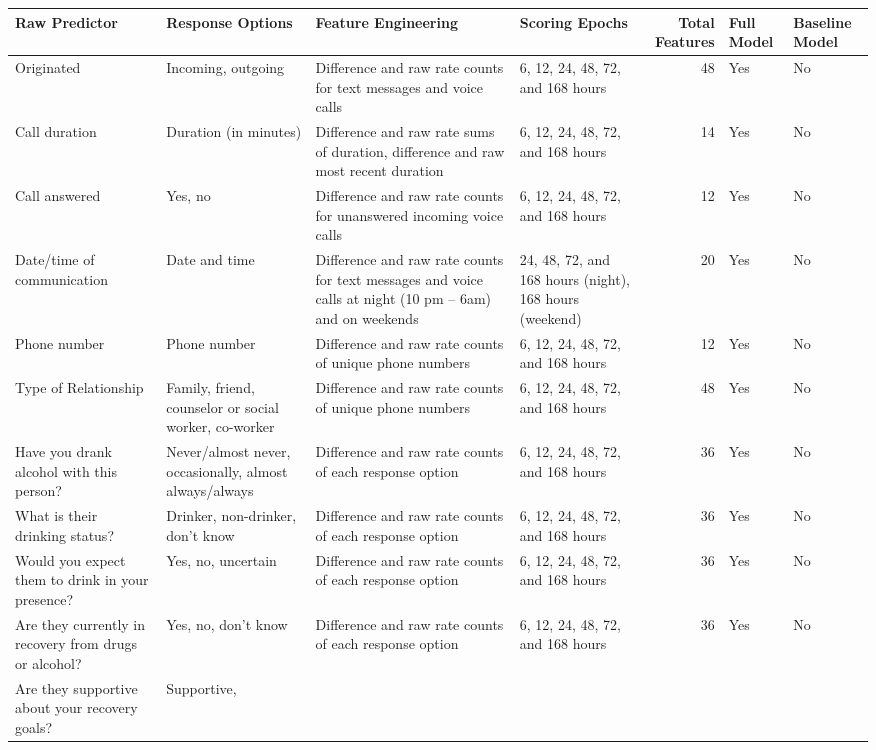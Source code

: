 \documentclass[
  letterpaper,
  DIV=11,
  numbers=noendperiod]{scrartcl}
\begin{document}
\begin{longtable}[]{@{}llllrll@{}}

\toprule\noalign{}
Raw Predictor & Response Options & Feature Engineering & Scoring Epochs
& Total Features & Full Model & Baseline Model \\
\midrule\noalign{}
\endhead
\bottomrule\noalign{}
\endlastfoot
Originated & Incoming, outgoing & Difference and raw rate counts for
text messages and voice calls & 6, 12, 24, 48, 72, and 168 hours & 48 &
Yes & No \\
Call duration & Duration (in minutes) & Difference and raw rate sums of
duration, difference and raw most recent duration & 6, 12, 24, 48, 72,
and 168 hours & 14 & Yes & No \\
Call answered & Yes, no & Difference and raw rate counts for unanswered
incoming voice calls & 6, 12, 24, 48, 72, and 168 hours & 12 & Yes &
No \\
Date/time of communication & Date and time & Difference and raw rate
counts for text messages and voice calls at night (10 pm -- 6am) and on
weekends & 24, 48, 72, and 168 hours (night), 168 hours (weekend) & 20 &
Yes & No \\
Phone number & Phone number & Difference and raw rate counts of unique
phone numbers & 6, 12, 24, 48, 72, and 168 hours & 12 & Yes & No \\
Type of Relationship & Family, friend, counselor or social worker,
co-worker & Difference and raw rate counts of unique phone numbers & 6,
12, 24, 48, 72, and 168 hours & 48 & Yes & No \\
Have you drank alcohol with this person? & Never/almost never,
occasionally, almost always/always & Difference and raw rate counts of
each response option & 6, 12, 24, 48, 72, and 168 hours & 36 & Yes &
No \\
What is their drinking status? & Drinker, non-drinker, don't know &
Difference and raw rate counts of each response option & 6, 12, 24, 48,
72, and 168 hours & 36 & Yes & No \\
Would you expect them to drink in your presence? & Yes, no, uncertain &
Difference and raw rate counts of each response option & 6, 12, 24, 48,
72, and 168 hours & 36 & Yes & No \\
Are they currently in recovery from drugs or alcohol? & Yes, no, don't
know & Difference and raw rate counts of each response option & 6, 12,
24, 48, 72, and 168 hours & 36 & Yes & No \\
Are they supportive about your recovery goals? & Supportive,

\end{longtable}
\end{document}
